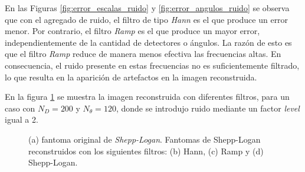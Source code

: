 \documentclass[11pt, twocolumn]{article}
\begin{document}
En las Figuras \ref{fig:error_escalas_ruido} y \ref{fig:error_angulos_ruido} se observa que con el agregado de ruido, el filtro de tipo \textit{Hann} es el que produce un error menor. Por contrario, el filtro \textit{Ramp} es el que produce un mayor error, independientemente de la cantidad de detectores o ángulos. La razón de esto es que el filtro \textit{Ramp} reduce de manera menos efectiva las frecuencias altas. En consecuencia, el ruido presente en estas frecuencias no es suficientemente filtrado, lo que resulta en la aparición de artefactos en la imagen reconstruida.

En la figura \ref{fig:reconstruccion_ruido} se muestra la imagen reconstruida con diferentes filtros, para un caso con $N_D = 200$ y $N_\theta = 120$, donde se introdujo ruido mediante un factor \textit{level} igual a 2.

\begin{figure}[H]
    \centering
    \hfill
    \hfill
    \hfill
    \hfill
    \caption{(a) fantoma original de \textit{Shepp-Logan}. Fantomas de Shepp-Logan reconstruidos con los siguientes filtros: (b) Hann, (c) Ramp y (d) Shepp-Logan.}
    \label{fig:reconstruccion_ruido}
\end{figure}
\end{document}
